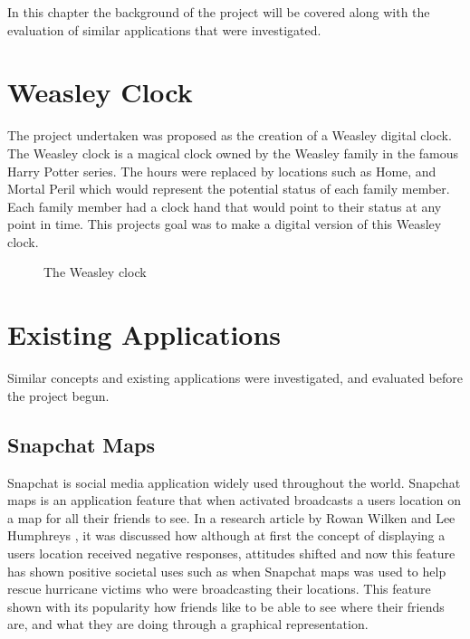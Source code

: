 In this chapter the background of the project will be covered along with the evaluation of similar applications that were investigated.

\section{Weasley Clock}

The project undertaken was proposed as the creation of a Weasley digital clock. The Weasley clock is a magical clock owned by the Weasley family in the famous Harry Potter series. The hours were replaced by locations such as Home, and Mortal Peril which would represent the potential status of each family member. Each family member had a clock hand that would point to their status at any point in time. This projects goal was to make a digital version of this Weasley clock. 
\begin{figure}[!htbp]
    \centering
    \begin{subfigure}[b]{0.25\textwidth}
    \end{subfigure}
    \caption[The Weasley clock]{The Weasley clock \cite{weasClockWiki}}
    \label{fig:weasClock}
\end{figure}
\FloatBarrier

\section{Existing Applications}
Similar concepts and existing applications were investigated, and evaluated before the project begun. 


\subsection{Snapchat Maps}
Snapchat is social media application widely used throughout the world. Snapchat maps is an application feature that when activated broadcasts a users location on a map for all their friends to see. In a research article by Rowan Wilken and Lee Humphreys \cite{snapMaps}, it was discussed how although at first the concept of displaying a users location received negative responses, attitudes shifted and now this feature has shown positive societal uses such as when Snapchat maps was used to help rescue hurricane victims who were broadcasting their locations. This feature shown with its popularity how friends like to be able to see where their friends are, and what they are doing through a graphical representation. 

